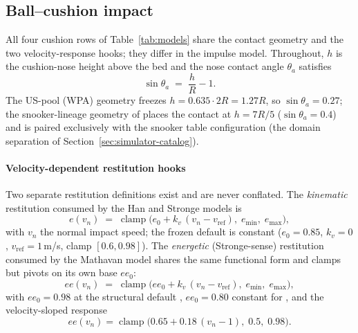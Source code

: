 \subsection{Ball--cushion impact}
\label{sec:appendix-eq-cushion}

All four cushion rows of Table~\ref{tab:models} share the contact
geometry and the two velocity-response hooks; they differ in the
impulse model. Throughout, $h$ is the cushion-nose height above the
bed and the nose contact angle $\theta_a$ satisfies
\begin{equation}
\sin\theta_a \;=\; \frac{h}{R} - 1 .
\label{eq:cushion-geom}
\end{equation}
The US-pool (WPA) geometry freezes $h = 0.635 \cdot 2R = 1.27R$, so
$\sin\theta_a = 0.27$; the snooker-lineage geometry of
\citet{mathavan2010cushion} places the contact at $h = 7R/5$
($\sin\theta_a = 0.4$) and is paired exclusively with the snooker
table configuration (the domain separation of
Section~\ref{sec:simulator-catalog}).

\paragraph{Velocity-dependent restitution hooks} Two separate restitution
definitions exist and are never conflated. The \emph{kinematic}
restitution consumed by the Han and Stronge models is
\begin{equation}
e(v_n) \;=\; \operatorname{clamp}\bigl(e_0 + k_v\,(v_n -
v_{\mathrm{ref}}),\; e_{\min},\; e_{\max}\bigr),
\label{eq:ec-kinematic}
\end{equation}
with $v_n$ the normal impact speed; the frozen default is constant
($e_0 = 0.85$, $k_v = 0$, $v_{\mathrm{ref}} = 1$\,m/s, clamp
$[0.6, 0.98]$). The \emph{energetic} (Stronge-sense) restitution
consumed by the Mathavan model shares the same functional form and
clamps but pivots on its own base $ee_0$:
\begin{equation}
ee(v_n) \;=\; \operatorname{clamp}\bigl(ee_0 + k_v\,(v_n -
v_{\mathrm{ref}}),\; e_{\min},\; e_{\max}\bigr),
\label{eq:ec-energetic}
\end{equation}
with $ee_0 = 0.98$ at the structural default
\citep[the snooker fit of][]{mathavan2010cushion}, $ee_0 = 0.80$
constant for , and the velocity-sloped
 response
\begin{equation}
ee(v_n) = \operatorname{clamp}\bigl(0.65 + 0.18\,(v_n - 1),\;
0.5,\; 0.98\bigr).
\label{eq:ec-grip}
\end{equation}


